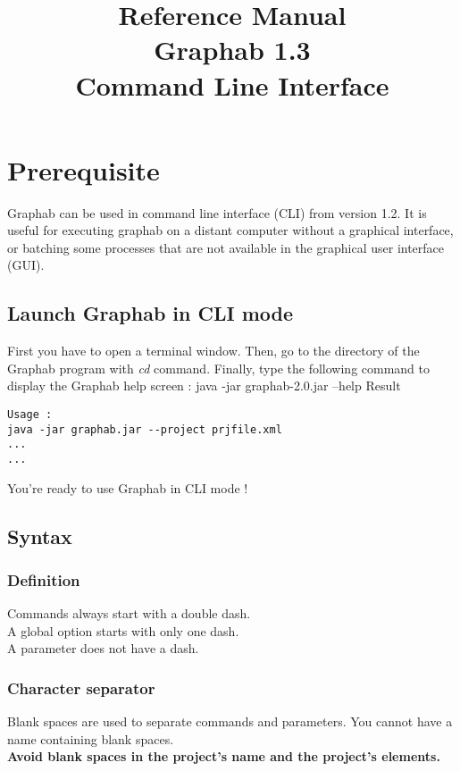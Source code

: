 \documentclass[a4paper,10pt]{report}
\title{Reference Manual\\
Graphab 1.3\\
Command Line Interface }
\newenvironment{cmd}
{\quote\Verbatim}
{\endVerbatim\endquote}
\begin{document}
\maketitle


\parindent 0pt

\tableofcontents

\chapter{Prerequisite}

Graphab can be used in command line interface (CLI) from version 1.2.
It is useful for executing graphab on a distant computer without a graphical interface, or batching some processes that are not available in the graphical user interface (GUI).

\section{Launch Graphab in CLI mode}
First you have to open a terminal window.
Then, go to the directory of the Graphab program with \textit{cd} command.
Finally, type the following command to display the Graphab help screen :
\begin{cmd}
java -jar graphab-2.0.jar --help
\end{cmd}
Result
\begin{verbatim}
Usage :
java -jar graphab.jar --project prjfile.xml
...
...
\end{verbatim}
You're ready to use Graphab in CLI mode !

\section{Syntax}
\subsection{Definition}
Commands always start with a double dash.\\
A global option starts with only one dash.\\
A parameter does not have a dash.\\
\subsection{Character separator}
Blank spaces are used to separate commands and parameters. You cannot have a name containing blank spaces.\\
\textbf{Avoid blank spaces in the project's name and the project's elements.}
\end{document}
